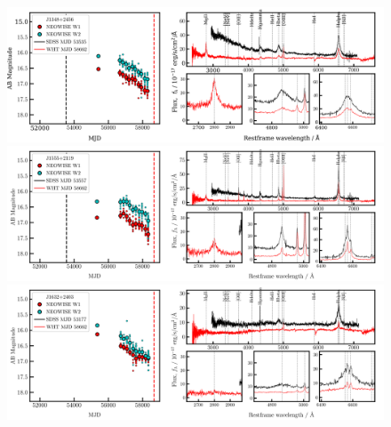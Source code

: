 \documentclass[a4paper,fleqn,usenatbib]{mnras}
\begin{document}
 \begin{figure}
  \centering
  \includegraphics[width=16.7cm, trim=0.0cm 0.05cm 0.2cm 0.1cm, clip]
  {../plots/LCs_and_spectra/J1348+2456_landscape_temp.png}
  \includegraphics[width=16.7cm, trim=0.0cm 0.05cm 0.2cm 0.1cm, clip]
  {../plots/LCs_and_spectra/J1555+2119_landscape_temp.png}
  \includegraphics[width=16.7cm, trim=0.0cm 0.0cm  0.2cm 0.1cm, clip]
  {../plots/LCs_and_spectra/J1634+1118_landscape_temp.png}
  \vspace{-12pt}
  \caption[]{}
  \label{fig:faders}
\end{figure}
\end{document}
